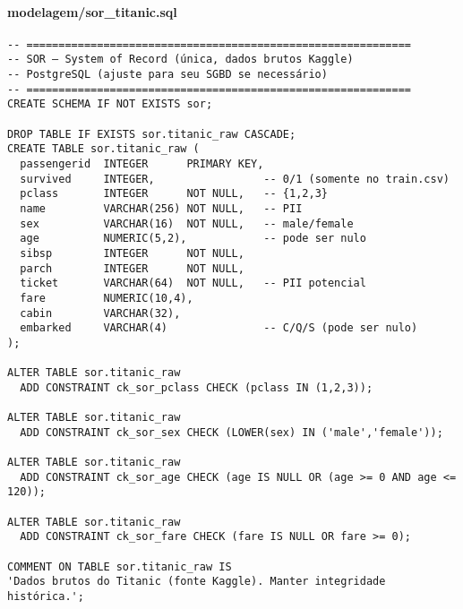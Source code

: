 \documentclass[12pt,a4paper]{article}
\begin{document}
\paragraph{modelagem/sor_titanic.sql}
\begin{verbatim}
-- ============================================================
-- SOR — System of Record (única, dados brutos Kaggle)
-- PostgreSQL (ajuste para seu SGBD se necessário)
-- ============================================================
CREATE SCHEMA IF NOT EXISTS sor;

DROP TABLE IF EXISTS sor.titanic_raw CASCADE;
CREATE TABLE sor.titanic_raw (
  passengerid  INTEGER      PRIMARY KEY,
  survived     INTEGER,                 -- 0/1 (somente no train.csv)
  pclass       INTEGER      NOT NULL,   -- {1,2,3}
  name         VARCHAR(256) NOT NULL,   -- PII
  sex          VARCHAR(16)  NOT NULL,   -- male/female
  age          NUMERIC(5,2),            -- pode ser nulo
  sibsp        INTEGER      NOT NULL,
  parch        INTEGER      NOT NULL,
  ticket       VARCHAR(64)  NOT NULL,   -- PII potencial
  fare         NUMERIC(10,4),
  cabin        VARCHAR(32),
  embarked     VARCHAR(4)               -- C/Q/S (pode ser nulo)
);

ALTER TABLE sor.titanic_raw
  ADD CONSTRAINT ck_sor_pclass CHECK (pclass IN (1,2,3));

ALTER TABLE sor.titanic_raw
  ADD CONSTRAINT ck_sor_sex CHECK (LOWER(sex) IN ('male','female'));

ALTER TABLE sor.titanic_raw
  ADD CONSTRAINT ck_sor_age CHECK (age IS NULL OR (age >= 0 AND age <= 120));

ALTER TABLE sor.titanic_raw
  ADD CONSTRAINT ck_sor_fare CHECK (fare IS NULL OR fare >= 0);

COMMENT ON TABLE sor.titanic_raw IS
'Dados brutos do Titanic (fonte Kaggle). Manter integridade histórica.';
\end{verbatim}
\end{document}
